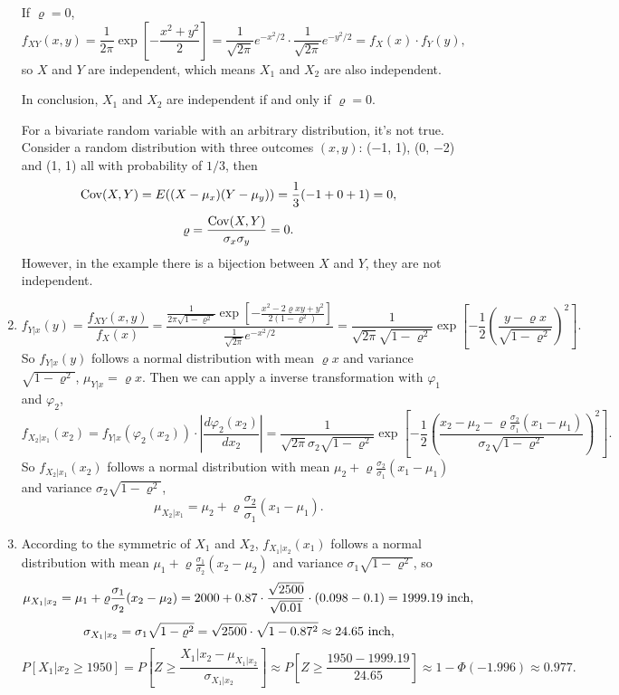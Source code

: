 \documentclass[11pt,a4paper]{article}
\begin{document}
\begin{enumerate}[label=\roman*)]
If $\varrho=0$,
$$f_{XY}(x,y)=\frac{1}{2\pi}\exp\left[-\frac{x^2+y^2}{2}\right]=\frac{1}{\sqrt{2\pi}}e^{-x^2/2}\cdot\frac{1}{\sqrt{2\pi}}e^{-y^2/2}=f_X(x)\cdot f_Y(y),$$
so $X$ and $Y$ are independent, which means $X_1$ and $X_2$ are also independent.

In conclusion, $X_1$ and $X_2$ are independent if and only if $\varrho=0$.

For a bivariate random variable with an arbitrary distribution, it's not true. Consider a random distribution with three outcomes $(x,y)$: (−1, 1), (0, −2) and (1, 1) all with probability of $1/3$, then 
$${\rm Cov}(X,Y)=E((X-\mu_x)(Y-\mu_y))=\frac{1}{3}(-1+0+1)=0,$$
$$\varrho=\frac{{\rm Cov}(X,Y)}{\sigma_x\sigma_y}=0.$$
However, in the example there is a bijection between $X$ and $Y$, they are not independent.
\item
$$f_{Y|x}(y)=\frac{f_{XY}(x,y)}{f_X(x)}=\frac{\frac{1}{2\pi\sqrt{1-\varrho^2}}\exp\left[-\frac{x^2-2\varrho xy+y^2}{2(1-\varrho^2)}\right]}{\frac{1}{\sqrt{2\pi}}e^{-x^2/2}}=\frac{1}{\sqrt{2\pi}\sqrt{1-\varrho^2}}\exp\left[-\frac{1}{2}\left(\frac{y-\varrho x}{\sqrt{1-\varrho^2}}\right)^2\right].$$
So $f_{Y|x}(y)$ follows a normal distribution with mean $\varrho x$ and variance $\sqrt{1-\varrho^2}$, $\mu_{Y|x}=\varrho x$. Then we can apply a inverse transformation with $\varphi_1$ and $\varphi_2$,
$$f_{X_2|x_1}(x_2)=f_{Y|x}(\varphi_2(x_2))\cdot\left|\frac{d\varphi_2(x_2)}{dx_2}\right|=\frac{1}{\sqrt{2\pi}\sigma_2\sqrt{1-\varrho^2}}\exp\left[-\frac{1}{2}\left(\frac{x_2-\mu_2-\varrho\frac{\sigma_2}{\sigma_1}(x_1-\mu_1)}{\sigma_2\sqrt{1-\varrho^2}}\right)^2\right].$$
So $f_{X_2|x_1}(x_2)$ follows a normal distribution with mean $\mu_2+\varrho\frac{\sigma_2}{\sigma_1}(x_1-\mu_1)$ and variance $\sigma_2\sqrt{1-\varrho^2}$,
$$\mu_{X_2|x_1}=\mu_2+\varrho\frac{\sigma_2}{\sigma_1}(x_1-\mu_1).$$
\item
According to the symmetric of $X_1$ and $X_2$, $f_{X_1|x_2}(x_1)$ follows a normal distribution with mean $\mu_1+\varrho\frac{\sigma_1}{\sigma_2}(x_2-\mu_2)$ and variance $\sigma_1\sqrt{1-\varrho^2}$, so
$$\mu_{X_1|x_2}=\mu_1+\varrho\frac{\sigma_1}{\sigma_2}(x_2-\mu_2)=2000+0.87\cdot\frac{\sqrt{2500}}{\sqrt{0.01}}\cdot(0.098-0.1)=1999.19{\rm~inch},$$
$$\sigma_{X_1|x_2}=\sigma_1\sqrt{1-\varrho^2}=\sqrt{2500}\cdot\sqrt{1-0.87^2}\approx24.65{\rm~inch},$$
$$P[X_1|x_2\geqslant1950]=P\left[Z\geqslant\frac{X_1|x_2-\mu_{X_1|x_2}}{\sigma_{X_1|x_2}}\right]\approx P\left[Z\geqslant\frac{1950-1999.19}{24.65}\right]\approx 1-\Phi(-1.996)\approx0.977.$$
\end{enumerate}
\end{document}
